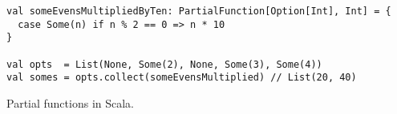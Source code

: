 \begin{algorithm}
\begin{verbatim}
val someEvensMultipliedByTen: PartialFunction[Option[Int], Int] = {
  case Some(n) if n % 2 == 0 => n * 10
}

val opts  = List(None, Some(2), None, Some(3), Some(4))
val somes = opts.collect(someEvensMultiplied) // List(20, 40)
\end{verbatim}

\caption{Partial functions in Scala. \label{scala:partial-function}}
\end{algorithm}